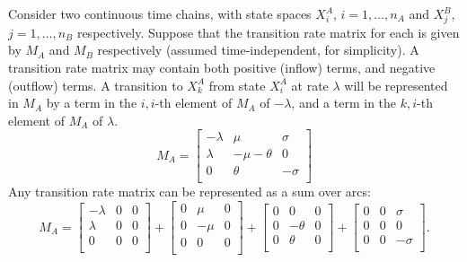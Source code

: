 \documentclass[review]{elsarticle}
\begin{document}
Consider two continuous time chains, with 
state spaces $X_i^{A}$, $i=1,\ldots,n_A$ and $X_j^{B}$, $j=1,\ldots,n_B$
respectively.  Suppose that the transition rate matrix for each is
given by $M_A$ and $M_B$ respectively (assumed time-independent,
for simplicity).  A
transition rate matrix may contain both positive (inflow) terms, and negative
(outflow) terms.  A transition to $X_k^A$ from state $X_i^A$ at rate $\lambda$
will be represented in $M_A$ by a term in the $i,i$-th element of $M_A$ of $-\lambda$,
and a term in the $k,i$-th element of $M_A$ of $\lambda$.
\begin{dmath*}
M_A = \left[ \begin{array}{ccc}
-\lambda & \mu & \sigma \\
\lambda & -\mu - \theta & 0 \\
0 & \theta & -\sigma \\
\end{array}\right]
\end{dmath*}
Any transition
rate matrix can be represented as a sum over arcs:
\begin{dmath*}
M_A = \left[ \begin{array}{ccc}
-\lambda & 0 & 0 \\
\lambda & 0 & 0 \\
0 & 0 & 0 \\
\end{array}\right]
 + \left[ \begin{array}{ccc}
0 & \mu  & 0 \\
0 & -\mu & 0 \\
0 & 0 & 0 \\
\end{array}\right]
+ \left[ \begin{array}{ccc}
0 & 0 & 0 \\
0 & - \theta & 0 \\
0 & \theta & 0 \\
\end{array}\right]
+ \left[ \begin{array}{ccc}
0 & 0 & \sigma \\
0 & 0 & 0 \\
0 & 0 & -\sigma \\
\end{array}\right].
\end{dmath*}
\end{document}
